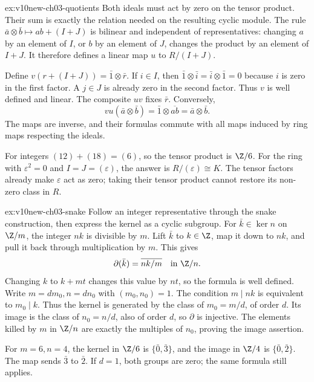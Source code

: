 \begin{solution}{ex:v10new-ch03-quotients}
\idea Both ideals must act by zero on the tensor product. Their sum is exactly the relation needed on the resulting cyclic module.
\writeup The rule $\bar a\otimes\bar b\mapsto ab+(I+J)$ is bilinear and independent of representatives: changing $a$ by an element of $I$, or $b$ by an element of $J$, changes the product by an element of $I+J$. It therefore defines a linear map $u$ to $R/(I+J)$.

Define $v(r+(I+J))=\bar1\otimes\bar r$. If $i\in I$, then $\bar1\otimes\bar i=\bar i\otimes\bar1=0$ because $i$ is zero in the first factor. A $j\in J$ is already zero in the second factor. Thus $v$ is well defined and linear. The composite $uv$ fixes $\bar r$. Conversely,
\[
vu(\bar a\otimes\bar b)=\bar1\otimes\overline{ab}
=\bar a\otimes\bar b.
\]
The maps are inverse, and their formulas commute with all maps induced by ring maps respecting the ideals.

For integers $(12)+(18)=(6)$, so the tensor product is $\Z/6$. For the ring with $\varepsilon^2=0$ and $I=J=(\varepsilon)$, the answer is $R/(\varepsilon)\cong K$. The tensor factors already make $\varepsilon$ act as zero; taking their tensor product cannot restore its non-zero class in $R$.
\end{solution}

\begin{solution}{ex:v10new-ch03-snake}
\idea Follow an integer representative through the snake construction, then express the kernel as a cyclic subgroup.
\writeup For $\bar k\in\ker n$ on $\Z/m$, the integer $nk$ is divisible by $m$. Lift $\bar k$ to $k\in\Z$, map it down to $nk$, and pull it back through multiplication by $m$. This gives
\[
\partial(\bar k)=\overline{nk/m}\quad\hbox{in }\Z/n.
\]
Changing $k$ to $k+mt$ changes this value by $nt$, so the formula is well defined. Write $m=dm_0,n=dn_0$ with $(m_0,n_0)=1$. The condition $m\mid nk$ is equivalent to $m_0\mid k$. Thus the kernel is generated by the class of $m_0=m/d$, of order $d$. Its image is the class of $n_0=n/d$, also of order $d$, so $\partial$ is injective. The elements killed by $m$ in $\Z/n$ are exactly the multiples of $n_0$, proving the image assertion.

For $m=6,n=4$, the kernel in $\Z/6$ is $\{\bar0,\bar3\}$, and the image in $\Z/4$ is $\{\bar0,\bar2\}$. The map sends $\bar3$ to $\bar2$. If $d=1$, both groups are zero; the same formula still applies.
\end{solution}

